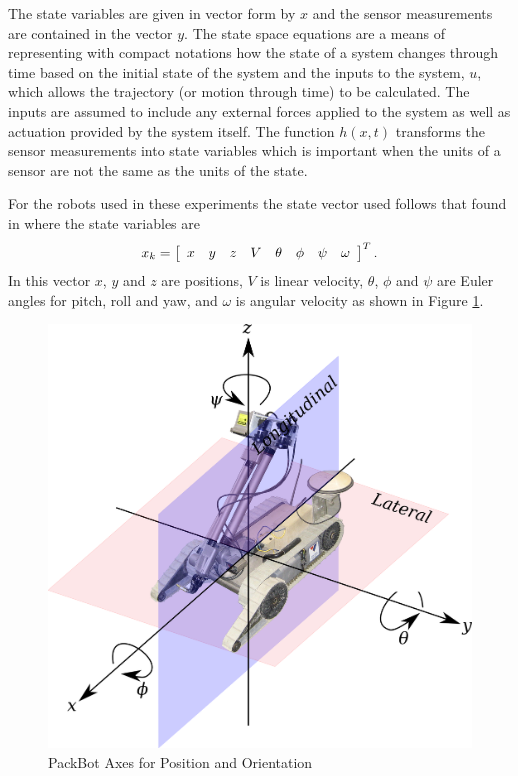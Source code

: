 The state variables are given in vector form by $x$ and the sensor measurements are contained in the vector $y$. The state space equations are a means of representing with compact notations how the state of a system changes through time based on the initial state of the system and the inputs to the system, $u$, which allows the trajectory (or motion through time) to be calculated. The inputs are assumed to include any external forces applied to the system as well as actuation provided by the system itself. The function $h(x,t)$ transforms the sensor measurements into state variables which is important when the units of a sensor are not the same as the units of the state.

For the robots used in these experiments the state vector used follows that found in \cite{Kelly_1994_338, Kelly_1994_333} where the state variables are
\begin{align*}
x_k = \left[\begin{array}{c c c c c c c c} x & y & z & V & \theta & \phi & \psi & \omega \end{array}\right]^T.
\end{align*}
In this vector $x$, $y$ and $z$ are positions, $V$ is linear velocity, $\theta$, $\phi$ and $\psi$ are Euler angles for pitch, roll and yaw, and $\omega$ is angular velocity as shown in Figure \ref{fig:packbotaxes}.

\begin{figure}[ht!]
    \centering
    \includegraphics[width=.8\textwidth]{images/packbotaxes}
    \caption{PackBot Axes for Position and Orientation}
    \label{fig:packbotaxes}
\end{figure}

